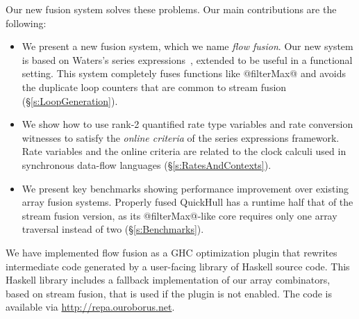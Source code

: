 Our new fusion system solves these problems.  Our main contributions are the following:
\begin{itemize}
\item   We present a new fusion system, which we name \emph{flow fusion}. Our new system is based on Waters's series expressions~\cite{Waters:series-expressions}, extended to be useful in a functional setting. This system completely fuses functions like @filterMax@ and avoids the duplicate loop counters that are common to stream fusion (\S\ref{s:LoopGeneration}).

\item   We show how to use rank-2 quantified rate type variables and rate conversion witnesses to satisfy the \emph{online criteria} of the series expressions framework. Rate variables and the online criteria  are related to the clock calculi used in synchronous data-flow languages (\S\ref{s:RatesAndContexts}).

\item   We present key benchmarks showing performance improvement over existing array fusion systems. Properly fused QuickHull has a runtime half that of the stream fusion version, as its @filterMax@-like core requires only one array traversal instead of two (\S\ref{s:Benchmarks}).
\end{itemize} 

We have implemented flow fusion as a GHC optimization plugin that rewrites intermediate code generated by a user-facing library of Haskell source code. This Haskell library includes a fallback implementation of our array combinators, based on stream fusion, that is used if the plugin is not enabled. The code is available via \url{http://repa.ouroborus.net}.
